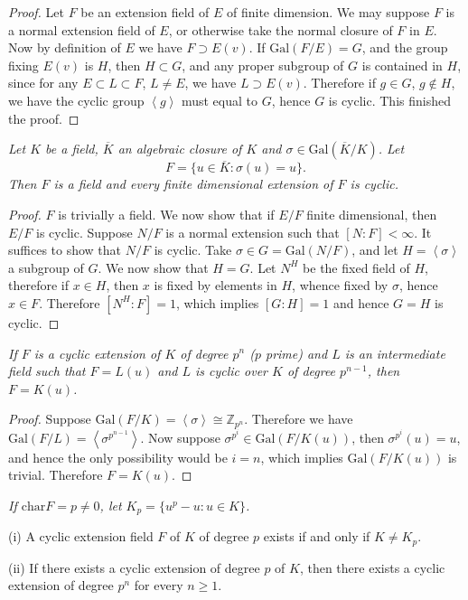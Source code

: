 \begin{proof}
Let $F$ be an extension field of $E$ of finite dimension. We may suppose $F$ is a normal extension field of $E$, or otherwise take the normal closure of $F$ in $E$. Now by definition of $E$ we have $F\supset E(v)$. If $\mathrm{Gal}(F/E)=G$, and the group fixing $E(v)$ is $H$, then $H\subset G$, and any proper subgroup of $G$ is contained in $H$, since for any $E\subset L\subset F$, $L\ne E$, we have $L\supset E(v)$. Therefore if $g\in G$, $g\notin H$, we have the cyclic group $\left<g\right>$ must equal to $G$, hence $G$ is cyclic. This finished the proof.
\end{proof}
\begin{problem}\em
Let $K$ be a field,
$\overline{K}$ an algebraic closure of $K$ and $\sigma\in \mathrm{Gal}(\overline{K}/K)$. Let 
$$F=\{u\in \overline{K}: \sigma(u)=u\}.$$
Then $F$ is a field and every finite dimensional extension of $F$ is cyclic.
\end{problem}
\begin{proof}
$F$ is trivially a field. We now show that if $E/F$ finite dimensional, then $E/F$ is cyclic. Suppose $N/F$ is a normal extension such that $[N:F]<\infty$. It suffices to show that $N/F$ is cyclic. Take $\sigma\in G=\mathrm{Gal}(N/F)$, and let $H=\left<\sigma\right>$ a subgroup of $G$. We now show that $H=G$. Let $N^H$ be the fixed field of $H$, therefore if $x\in H$, then $x$ is fixed by elements in $H$, whence fixed by $\sigma$, hence $x\in F$. Therefore $[N^H:F]=1$, which implies $[G:H]=1$ and hence $G=H$ is cyclic.
\end{proof}
\begin{problem}\em
If $F$ is a cyclic extension of $K$ of degree $p^n$ ($p$ prime) and $L$ is an intermediate field such that $F=L(u)$ and $L$ is cyclic over $K$ of degree $p^{n-1}$, then $F=K(u)$.
\end{problem}
\begin{proof}
Suppose $\mathrm{Gal}(F/K)=\left<\sigma\right>\cong\mathbb{Z}_{p^n}$. Therefore we have $\mathrm{Gal}(F/L)=\left<\sigma^{p^{n-1}}\right>$. Now suppose $\sigma^{p^i}\in\mathrm{Gal}(F/K(u))$, then $\sigma^{p^i}(u)=u$, and hence the only possibility would be $i=n$, which implies $\mathrm{Gal}(F/K(u))$ is trivial. Therefore $F=K(u)$.
\end{proof}
\begin{problem}\em
If $\mathrm{char}F=p\neq 0$, let $K_p=\{u^p-u: u\in K\}$.\par
(i) A cyclic extension field $F$ of $K$ of degree $p$ exists if and only if $K\neq K_p$.\par
(ii) If there exists a cyclic extension of degree $p$ of $K$, then there exists a cyclic extension of degree $p^n$ for every $n\geq 1$.
\end{problem}
